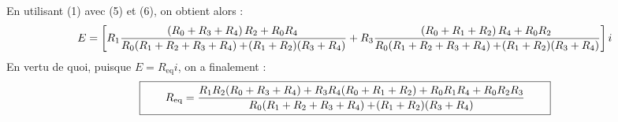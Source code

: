 \documentclass[a4paper,french,bookmarks]{article}
\begin{document}
    \text{}\bigskip
    
    En utilisant (1) avec (5) et (6), on obtient alors :
    \[ E = \intc{R_1\dfrac{\p{R_0 + R_3 + R_4}R_2 + R_0R_4}{R_0\p{R_1 + R_2 + R_3 + R_4} + \p{R_1 + R_2}\p{R_3 + R_4}} + R_3\dfrac{\p{R_0 + R_1 + R_2}R_4 + R_0R_2}{R_0\p{R_1 + R_2 + R_3 + R_4} + \p{R_1 + R_2}\p{R_3 + R_4}}}i\]
    En vertu de quoi, puisque $E = R_\text{eq}i$, on a finalement :
    \[\boxed{\qquad R_\text{eq} = \dfrac{R_1R_2\!\left(R_0 + R_3 + R_4\right) + R_3R_4\!\left(R_0 + R_1 + R_2\right) + R_0R_1R_4 + R_0R_2R_3}{R_0\!\left(R_1 + R_2 + R_3 + R_4\right) + \!\left(R_1 + R_2\right)\!\left(R_3 + R_4\right)}\qquad }\]
\end{document}
